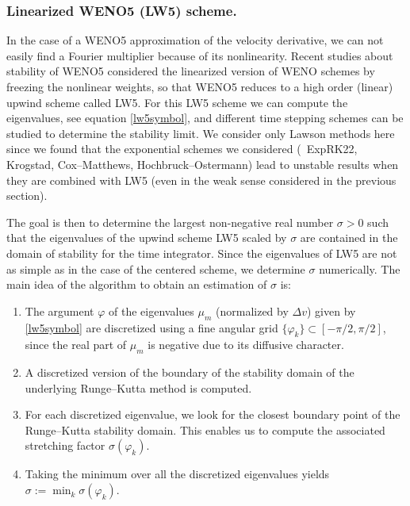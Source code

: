 \subsubsection{Linearized WENO5 (LW5) scheme. }

In the case of a WENO5 approximation of the velocity derivative, we can not 
easily find a Fourier multiplier because of its nonlinearity. 
Recent studies about stability of WENO5 \cite{Wang:2007, Motamed:2010, Lunet:2017} considered 
the linearized version of WENO schemes by freezing the nonlinear weights, 
so that WENO5 reduces to a high order (linear) upwind scheme called LW5. For this LW5 scheme we can
compute the eigenvalues, see equation \eqref{lw5symbol}, 
and different time stepping schemes can be studied to determine the stability limit. 
We consider only Lawson methods here since we found 
that the exponential schemes we considered (\ie{}~ExpRK22, Krogstad, Cox--Matthews, Hochbruck--Ostermann) 
lead to unstable results when they are combined with LW5 (even in the weak sense considered in the previous section).

The goal  is then to determine the largest non-negative real number $\sigma>0$ such that the 
eigenvalues of the upwind scheme LW5 scaled by $\sigma$ are contained in the domain of stability for the 
time integrator. Since the eigenvalues of LW5 are not as simple as in the case of the centered scheme, we determine $\sigma$ numerically. The main idea of the algorithm to obtain an estimation of $\sigma$ is:
\begin{enumerate}
    \item The argument $\varphi$ of the eigenvalues $\mu_m$  (normalized by $\Delta v$) given by \eqref{lw5symbol} are discretized using a fine angular grid $\{ \varphi_k\} \subset [-\pi/2, \pi/2]$, since the real part of $\mu_{m}$ is negative due to its diffusive character.
  \item A discretized version of the boundary of the stability domain of the underlying Runge--Kutta method is computed.
  \item For each discretized eigenvalue, we look for the closest boundary point of the Runge--Kutta stability domain. 
  This enables us to compute the associated stretching factor $\sigma(\varphi_k)$.
  \item Taking the minimum over all the discretized eigenvalues yields $\sigma:=\min_{k} \sigma(\varphi_k)$. 
\end{enumerate}




